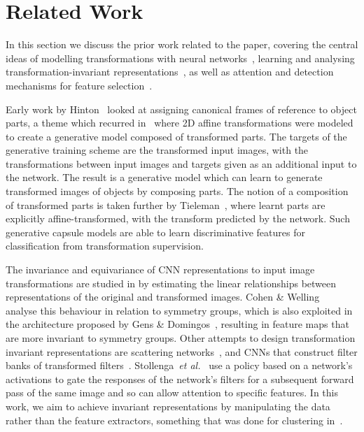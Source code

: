 \documentclass{article} %
\def\etal{\emph{et al.}}
\begin{document}
\section{Related Work}\label{sec:related}
In this section we discuss the prior work related to the paper, covering the central
ideas of modelling transformations with neural networks~\cite{Hinton81,Hinton11,Tieleman14},
learning and analysing transformation-invariant
representations~\cite{Gens14,Cohen15,Sohn12,Kanazawa14,Bruna13,Lenc14}, as well
as attention and detection mechanisms for feature
selection~\cite{Schmidhuber91,Ba14,Sermanet14b,Gregor15,Girshick14,Erhan14}.

Early work by Hinton~\cite{Hinton81} looked at assigning canonical frames of reference to object parts, a theme which recurred in~\cite{Hinton11} where 2D
affine transformations were modeled to create a generative model composed of transformed
parts. The targets of the generative training scheme are the transformed input
images, with the transformations between input images and targets given as an
additional input to the network. The result is a generative model which can
learn to generate transformed images of objects by composing parts. The notion
of a composition of transformed parts is taken further by Tieleman~\cite{Tieleman14},
where learnt parts are explicitly affine-transformed, with the transform predicted
by the network. Such generative capsule models are able to learn discriminative
features for classification from transformation supervision.

The invariance and equivariance of CNN representations to input image
transformations are studied in \cite{Lenc14} by estimating the linear relationships
between representations of the original and transformed images.
Cohen \& Welling~\cite{Cohen15} analyse this behaviour in relation to symmetry groups,
which is also exploited in the architecture proposed by Gens \& Domingos~\cite{Gens14},
resulting in feature maps that are more invariant to symmetry groups. Other attempts
to design transformation invariant representations are scattering networks~\cite{Bruna13},
and CNNs that construct filter banks of transformed filters~\cite{Sohn12,Kanazawa14}.
Stollenga~\etal~\cite{Stollenga14} use a policy based on a network's
activations to gate the responses of the network's filters for a subsequent
forward pass of the same image and so can allow attention to specific features.
In this work, we aim to achieve invariant representations by manipulating the data
rather than the feature extractors, something that was done for clustering in~\cite{Frey01b}.
\end{document}
